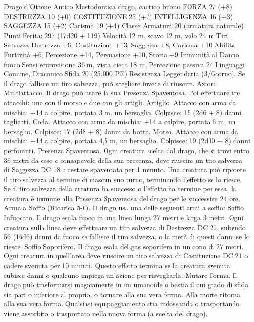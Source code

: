 \begin{multicols}{2}
Drago d’Ottone Antico
Mastodontica drago, caotico buono
FORZA 27 (+8)
DESTREZZA 10 (+0)
COSTITUZIONE 25 (+7)
INTELLIGENZA 16 (+3)
SAGGEZZA 15 (+2)
Carisma 19 (+4)
Classe Armatura 20 (armatura naturale)
\hspace*{0pt}\hfill{Punti Ferita}: 297 (17d20 + 119)
Velocità 12 m, scavo 12 m, volo 24 m
Tiri Salvezza Destrezza +6, Costituzione +13, Saggezza +8,
Carisma +10
Abilità Furtività +6, Percezione +14, Persuasione +10, Storia +9
Immunità al Danno fuoco
Sensi scurovisione 36 m, vista cieca 18 m, Percezione passiva 24
Linguaggi Comune, Draconico
Sfida 20 (25.000 PE)
Resistenza Leggendaria (3/Giorno). Se il drago fallisce un tiro
salvezza, può scegliere invece di riuscire.
Azioni
Multiattacco. Il drago può usare la sua Presenza Spaventosa. Poi
effettuare tre attacchi: uno con il morso e due con gli artigli.
Artiglio. Attacco con arma da mischia: +14 a colpire, portata 3
m, un bersaglio.
Colpisce: 15 (2d6 + 8) danni taglienti.
Coda. Attacco con arma da mischia: +14 a colpire, portata 6 m,
un bersaglio.
Colpisce: 17 (2d8 + 8) danni da botta.
Morso. Attacco con arma da mischia: +14 a colpire, portata 4,5
m, un bersaglio.
Colpisce: 19 (2d10 + 8) danni perforanti.
Presenza Spaventosa. Ogni creatura scelta dal drago, che si trovi
entro 36 metri da esso e consapevole della sua presenza, deve
riuscire un tiro salvezza di Saggezza DC 18 o restare spaventata per
1 minuto. Una creatura può ripetere il tiro salvezza al termine di
ciascun suo turno, terminando l’effetto se lo riesce. Se il tiro salvezza
della creatura ha successo o l’effetto ha termine per essa, la creatura è
immune alla Presenza Spaventosa del drago per le successive 24 ore.
Arma a Soffio (Ricarica 5-6). Il drago usa una delle seguenti armi
a soffio:
Soffio Infuocato. Il drago esala fuoco in una linea lunga 27 metri e
larga 3 metri. Ogni creatura sulla linea deve effettuare un tiro
salvezza di Destrezza DC 21, subendo 56 (16d6) danni da fuoco se
fallisce il tiro salvezza, o la metà di questi danni se lo riesce.
Soffio Soporifero. Il drago esala del gas soporifero in un cono di 27
metri. Ogni creatura in quell’area deve riuscire un tiro salvezza di
Costituzione DC 21 o cadere svenuta per 10 minuti. Questo effetto
termina se la creatura svenuta subisce danni o qualcuno impiega
un’azione per risvegliarla.
Mutare Forma. Il drago può trasformarsi magicamente in un
umanoide o bestia il cui grado di sfida sia pari o inferiore al proprio,
o tornare alla sua vera forma. Alla morte ritorna alla sua vera forma.
Qualsiasi equipaggiamento stia indossando o trasportando viene
assorbito o trasportato nella nuova forma (a scelta del drago).

\end{multicols}
